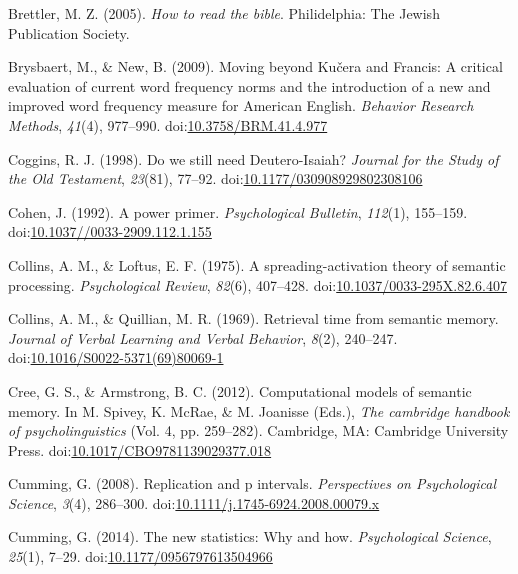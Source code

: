 \documentclass[english,man]{apa6}
\theoremstyle{definition}
\theoremstyle{definition}
\theoremstyle{definition}
\theoremstyle{remark}
\begin{document}
\hypertarget{ref-Brettler2005}{}
Brettler, M. Z. (2005). \emph{How to read the bible}. Philidelphia: The
Jewish Publication Society.

\hypertarget{ref-Brysbaert2009}{}
Brysbaert, M., \& New, B. (2009). Moving beyond Kučera and Francis: A
critical evaluation of current word frequency norms and the introduction
of a new and improved word frequency measure for American English.
\emph{Behavior Research Methods}, \emph{41}(4), 977--990.
doi:\href{https://doi.org/10.3758/BRM.41.4.977}{10.3758/BRM.41.4.977}

\hypertarget{ref-Coggins1998}{}
Coggins, R. J. (1998). Do we still need Deutero-Isaiah? \emph{Journal
for the Study of the Old Testament}, \emph{23}(81), 77--92.
doi:\href{https://doi.org/10.1177/030908929802308106}{10.1177/030908929802308106}

\hypertarget{ref-Cohen1992a}{}
Cohen, J. (1992). A power primer. \emph{Psychological Bulletin},
\emph{112}(1), 155--159.
doi:\href{https://doi.org/10.1037//0033-2909.112.1.155}{10.1037//0033-2909.112.1.155}

\hypertarget{ref-Collins1975}{}
Collins, A. M., \& Loftus, E. F. (1975). A spreading-activation theory
of semantic processing. \emph{Psychological Review}, \emph{82}(6),
407--428.
doi:\href{https://doi.org/10.1037/0033-295X.82.6.407}{10.1037/0033-295X.82.6.407}

\hypertarget{ref-Collins1969}{}
Collins, A. M., \& Quillian, M. R. (1969). Retrieval time from semantic
memory. \emph{Journal of Verbal Learning and Verbal Behavior},
\emph{8}(2), 240--247.
doi:\href{https://doi.org/10.1016/S0022-5371(69)80069-1}{10.1016/S0022-5371(69)80069-1}

\hypertarget{ref-Cree2012}{}
Cree, G. S., \& Armstrong, B. C. (2012). Computational models of
semantic memory. In M. Spivey, K. McRae, \& M. Joanisse (Eds.),
\emph{The cambridge handbook of psycholinguistics} (Vol. 4, pp.
259--282). Cambridge, MA: Cambridge University Press.
doi:\href{https://doi.org/10.1017/CBO9781139029377.018}{10.1017/CBO9781139029377.018}

\hypertarget{ref-Cumming2008}{}
Cumming, G. (2008). Replication and p intervals. \emph{Perspectives on
Psychological Science}, \emph{3}(4), 286--300.
doi:\href{https://doi.org/10.1111/j.1745-6924.2008.00079.x}{10.1111/j.1745-6924.2008.00079.x}

\hypertarget{ref-Cumming2014}{}
Cumming, G. (2014). The new statistics: Why and how. \emph{Psychological
Science}, \emph{25}(1), 7--29.
doi:\href{https://doi.org/10.1177/0956797613504966}{10.1177/0956797613504966}
\end{document}
